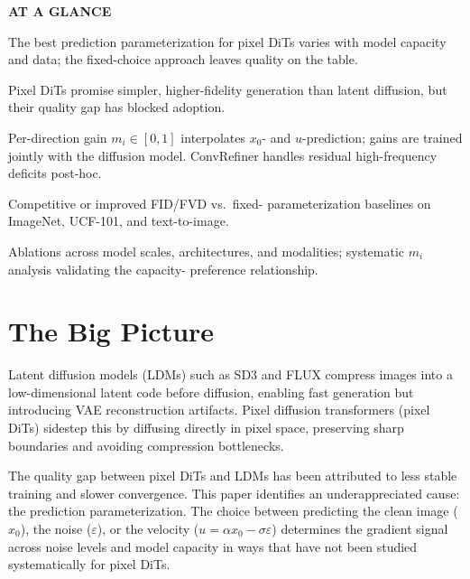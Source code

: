 \documentclass[10pt,twocolumn]{article}
\begin{document}
\begin{mdframed}[backgroundcolor=boxgray,linecolor=rulered,linewidth=1pt,
    innerleftmargin=6pt,innerrightmargin=6pt,
    innertopmargin=6pt,innerbottommargin=6pt]
\textbf{\small AT A GLANCE}\par\vspace{4pt}
\begin{description}[leftmargin=0pt,labelsep=4pt,itemsep=2pt,parsep=0pt,
    font=\small\bfseries]
  \item[Problem:] The best prediction parameterization for pixel DiTs
    varies with model capacity and data; the fixed-choice approach
    leaves quality on the table.
  \item[Why it matters:] Pixel DiTs promise simpler, higher-fidelity
    generation than latent diffusion, but their quality gap has
    blocked adoption.
  \item[Method:] Per-direction gain $m_i \in [0,1]$ interpolates
    $x_0$- and $u$-prediction; gains are trained jointly with the
    diffusion model. ConvRefiner handles residual high-frequency
    deficits post-hoc.
  \item[Result:] Competitive or improved FID/FVD vs.\ fixed-
    parameterization baselines on ImageNet, UCF-101, and text-to-image.
  \item[Evidence:] Ablations across model scales, architectures, and
    modalities; systematic $m_i$ analysis validating the capacity-
    preference relationship.
\end{description}
\end{mdframed}

\section{The Big Picture}

Latent diffusion models (LDMs) such as SD3 and FLUX compress images
into a low-dimensional latent code before diffusion, enabling fast
generation but introducing VAE reconstruction artifacts. Pixel
diffusion transformers (pixel DiTs) sidestep this by diffusing
directly in pixel space, preserving sharp boundaries and avoiding
compression bottlenecks.

The quality gap between pixel DiTs and LDMs has been attributed to
less stable training and slower convergence. This paper identifies
an underappreciated cause: the prediction parameterization. The
choice between predicting the clean image ($x_0$), the noise
($\varepsilon$), or the velocity ($u = \alpha x_0 - \sigma\varepsilon$)
determines the gradient signal across noise levels and model capacity
in ways that have not been studied systematically for pixel DiTs.
\end{document}
